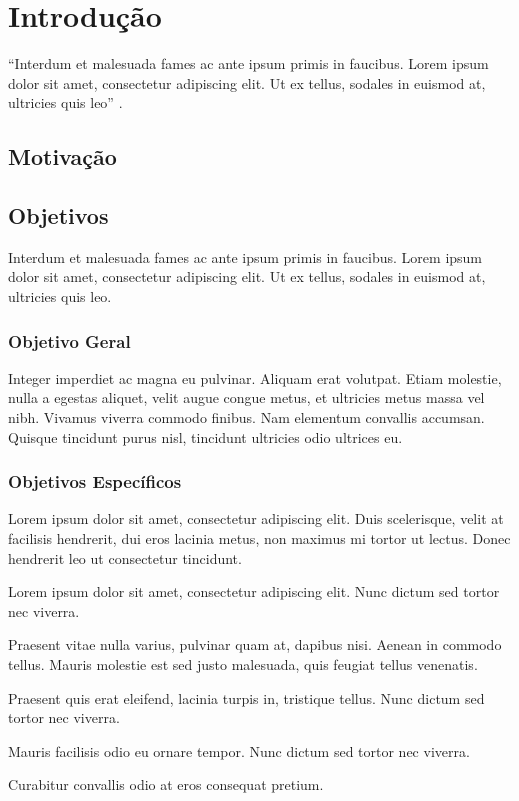 \chapter{Introdução}
\label{cap:introducao}

\enquote{Interdum et malesuada fames ac ante ipsum primis in faucibus. Lorem ipsum dolor sit amet, consectetur adipiscing elit. Ut ex tellus, sodales in euismod at, ultricies quis leo} \cite[p. 1637]{bartle}.

\lipsum[5]
\lipsum[6]
\lipsum[7]

\section{Motivação}
\label{sec:motivacao}

\lipsum[3]
\lipsum[4]

\section{Objetivos}
\label{sec:objetivos}

Interdum et malesuada fames ac ante ipsum primis in faucibus. Lorem ipsum dolor sit amet, consectetur adipiscing elit. Ut ex tellus, sodales in euismod at, ultricies quis leo.

\subsection{Objetivo Geral}
\label{sec:objetivo-geral}

Integer imperdiet ac magna eu pulvinar. Aliquam erat volutpat. Etiam molestie, nulla a egestas aliquet, velit augue congue metus, et ultricies metus massa vel nibh. Vivamus viverra commodo finibus. Nam elementum convallis accumsan. Quisque tincidunt purus nisl, tincidunt ultricies odio ultrices eu.

\subsection{Objetivos Específicos}
\label{sec:objetivos-especificos}

Lorem ipsum dolor sit amet, consectetur adipiscing elit. Duis scelerisque, velit at facilisis hendrerit, dui eros lacinia metus, non maximus mi tortor ut lectus. Donec hendrerit leo ut consectetur tincidunt. 

	\begin{alineas}
		\item Lorem ipsum dolor sit amet, consectetur adipiscing elit. Nunc dictum sed tortor nec viverra.
		\item Praesent vitae nulla varius, pulvinar quam at, dapibus nisi. Aenean in commodo tellus. Mauris molestie est sed justo malesuada, quis feugiat tellus venenatis.
		\item Praesent quis erat eleifend, lacinia turpis in, tristique tellus. Nunc dictum sed tortor nec viverra.
		\item Mauris facilisis odio eu ornare tempor. Nunc dictum sed tortor nec viverra.
		\item Curabitur convallis odio at eros consequat pretium.
	\end{alineas}
